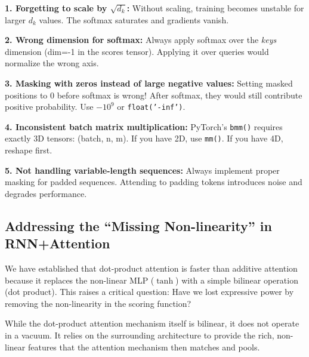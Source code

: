 \documentclass{article}
\begin{document}
\begin{tcolorbox}[colback=red!5!white, colframe=red!50!black, title=Watch Out For These Mistakes!]
\textbf{1. Forgetting to scale by $\sqrt{d_k}$:}
Without scaling, training becomes unstable for larger $d_k$ values. The softmax saturates and gradients vanish.

\textbf{2. Wrong dimension for softmax:}
Always apply softmax over the \textit{keys} dimension (dim=-1 in the scores tensor). Applying it over queries would normalize the wrong axis.

\textbf{3. Masking with zeros instead of large negative values:}
Setting masked positions to 0 before softmax is wrong! After softmax, they would still contribute positive probability. Use $-10^9$ or \texttt{float('-inf')}.

\textbf{4. Inconsistent batch matrix multiplication:}
PyTorch's \texttt{bmm()} requires exactly 3D tensors: (batch, n, m). If you have 2D, use \texttt{mm()}. If you have 4D, reshape first.

\textbf{5. Not handling variable-length sequences:}
Always implement proper masking for padded sequences. Attending to padding tokens introduces noise and degrades performance.
\end{tcolorbox}

\subsection{Addressing the ``Missing Non-linearity'' in RNN+Attention}

We have established that dot-product attention is faster than additive attention because it replaces the non-linear MLP ($\tanh$) with a simple bilinear operation (dot product). This raises a critical question: Have we lost expressive power by removing the non-linearity in the scoring function?

While the dot-product attention mechanism itself is bilinear, it does not operate in a vacuum. It relies on the surrounding architecture to provide the rich, non-linear features that the attention mechanism then matches and pools.
\end{document}
